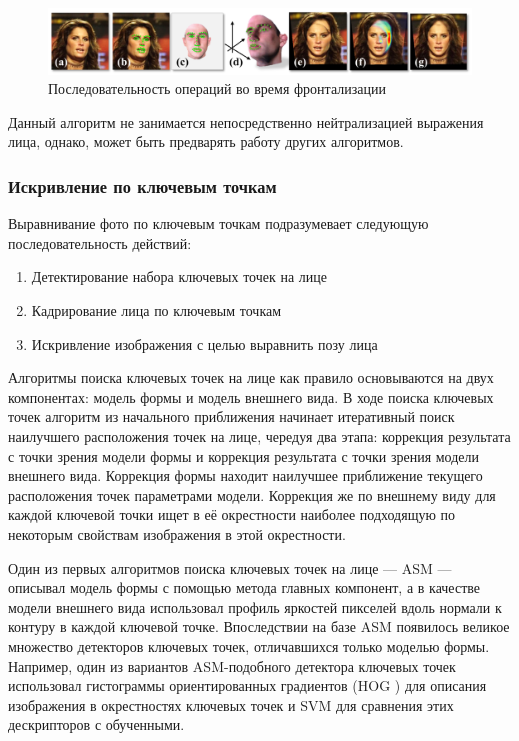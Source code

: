 \begin{figure}[t]
	\centering
	\includegraphics[width=\textwidth]{frontal2.png}
	\caption{Последовательность операций во время фронтализации}
	\label{fig:frontal2}
\end{figure}

Данный алгоритм не занимается непосредственно нейтрализацией выражения лица, однако, может быть предварять работу других алгоритмов.

\subsubsection{Искривление по ключевым точкам}

Выравнивание фото по ключевым точкам подразумевает следующую последовательность действий:
\begin{enumerate}
  \item Детектирование набора ключевых точек на лице
  \item Кадрирование лица по ключевым точкам
  \item Искривление изображения с целью выравнить позу лица
\end{enumerate}

Алгоритмы поиска ключевых точек на лице как правило основываются на двух компонентах: модель формы и модель внешнего вида. В ходе поиска ключевых точек алгоритм из начального приближения начинает итеративный поиск наилучшего расположения точек на лице, чередуя два этапа: коррекция результата с точки зрения модели формы и коррекция результата с точки зрения модели внешнего вида. Коррекция формы находит наилучшее приближение текущего расположения точек параметрами модели. Коррекция же по внешнему виду для каждой ключевой точки ищет в её окрестности наиболее подходящую по некоторым свойствам изображения в этой окрестности.

Один из первых алгоритмов поиска ключевых точек на лице --- ASM \cite{asm} --- описывал модель формы с помощью метода главных компонент, а в качестве модели внешнего вида использовал профиль яркостей пикселей вдоль нормали к контуру в каждой ключевой точке. Впоследствии на базе ASM появилось великое множество детекторов ключевых точек, отличавшихся только моделью формы. Например, один из вариантов ASM-подобного детектора ключевых точек использовал гистограммы ориентированных градиентов (HOG \cite{hog}) для описания изображения в окрестностях ключевых точек и SVM для сравнения этих дескрипторов с обученными.

